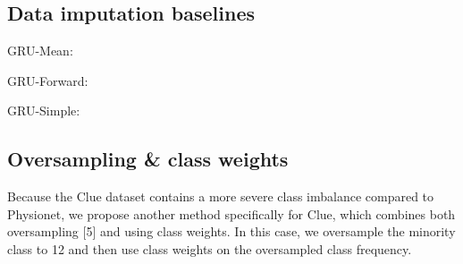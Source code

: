 \documentclass{article}
\begin{document}
\vspace{0.5cm}
\subsection{\large Data imputation baselines}
\vspace{0.4cm}
GRU-Mean: 

\noindent GRU-Forward: 

\noindent GRU-Simple: 

\vspace{0.5cm}
\subsection{\large Oversampling \& class weights}
Because the Clue dataset contains a more severe class imbalance compared to Physionet, we propose another method specifically for Clue, which combines both oversampling [5] and using class weights. In this case, 
 we oversample the minority class to 12 and then use class weights on the oversampled class frequency.
 
\newpage
\vspace{0.5cm}
\end{document}
